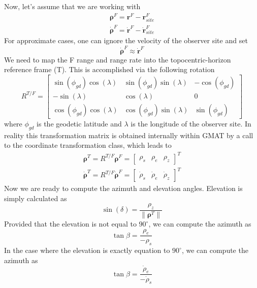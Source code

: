 Now, let's assume that we are working with
\begin{gather}
\boldsymbol\rho^{F} =  \mathbf{r}^{F} - \mathbf{r}_{site}^{F}\\
\dot{\boldsymbol\rho}^{F}  = \dot{\mathbf{r}}^{F} -
\dot{\mathbf{r}}_{site}^{F}
\end{gather}
 For approximate cases, one can ignore the velocity of the observer site and set
\begin{equation}
 \dot{\boldsymbol\rho}^{F}  \approx \dot{\mathbf{r}}^{F}
\end{equation}
 We need to map the F range and range rate into the topocentric-horizon reference frame (T). This is accomplished via the following rotation
 \begin{equation}
R^{T/F} = \begin{bmatrix}
\sin(\phi_{gd})\cos(\lambda) & \sin(\phi_{gd})\sin(\lambda) & -\cos(\phi_{gd}) \\
-\sin(\lambda) & \cos(\lambda) & 0\\
\cos(\phi_{gd})\cos(\lambda) & \cos(\phi_{gd})\sin(\lambda) & \sin(\phi_{gd})
\end{bmatrix}
\end{equation}
where $\phi_{gd}$ is the geodetic latitude and $\lambda$ is the
longitude of the observer site. In reality this transformation
matrix is obtained internally within GMAT by a call to the
coordinate transformation class, which leads to
\begin{gather}
\boldsymbol\rho^{T}  = R^{T/F} \boldsymbol\rho^{F}=\begin{bmatrix} \rho_s & \rho_e & \rho_z \end{bmatrix}^T\\
\dot{\boldsymbol\rho}^{T}  = R^{T/F}
\dot{\boldsymbol\rho}^{F}=\begin{bmatrix} \dot{\rho}_s &
\dot{\rho}_e & \dot{\rho}_z \end{bmatrix}^T \label{eq:Trot}
\end{gather}
Now we are ready to compute the azimuth and elevation angles.
Elevation is simply calculated as
\begin{equation}
\sin(\delta) = \frac{\rho_z}{\|\boldsymbol\rho^{T}\|}
\end{equation}
Provided that the elevation is not equal to $90^\circ$, we can
compute the azimuth as
\begin{equation}
\tan{\beta} = \frac{\rho_e}{-\rho_s}
\end{equation}
In the case where the elevation is exactly equation to $90^\circ$,
we can compute the azimuth as
\begin{equation}
\tan{\beta} = \frac{\dot{\rho}_e}{-\dot{\rho}_s}
\end{equation}

